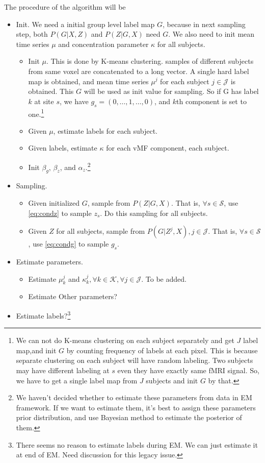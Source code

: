 \documentclass{article}
\begin{document}
The procedure of the algorithm will be 
\begin{itemize}
  \item Init. We need a initial group level label map $G$, because in next sampling step, both $P(G|X, Z)$ and $P(Z|G, X)$ need $G$. We also need to init mean time series $\mu$ and concentration parameter $\kappa$ for all subjects.
    \begin{itemize}
      \item Init $\mu$. This is done by K-means clustering. samples of different subjects from same voxel are concatenated to a long vector. A single hard label map is obtained, and mean time series $\mu^j$ for each subject $j\in \mathcal{J}$ is obtained. This $G$ will be used as init value for sampling. So if G has label $k$ at site $s$, we have $g_s = (0, \dots, 1, \dots, 0)$, and $k$th component is set to one.\footnote{We can not do K-means clustering on each subject separately and get $J$ label map,and init $G$ by counting frequency of labels at each pixel. This is because separate clustering on each subject will have random labeling. Two subjects may have different labeling at $s$ even they have exactly same fMRI signal. So, we have to get a single label map from $J$ subjects and init $G$ by that.} 
      \item Given $\mu$, estimate labels for each subject. 
      \item Given labels, estimate $\kappa$ for each vMF component, each subject.
      \item Init $\beta_g$, $\beta_z$, and $\alpha_z$.\footnote{We haven't decided whether to estimate these parameters from data in EM framework. If we want to estimate them, it's best to assign these parameters prior distribution, and use Bayesian method to estimate the posterior of them.}
    \end{itemize}
  \item Sampling.
    \begin{itemize}
    \item Given initialized $G$, sample from $P(Z|G, X)$. That is, $\forall s\in \mathcal{S}$, use \eqref{eq:condz} to sample $z_s$. Do this sampling for all subjects.
    \item Given  $Z$ for all subjects, sample from $P(G|Z^j, X), j\in \mathcal{J}$. That is, $\forall s\in \mathcal{S}$, use \eqref{eq:condg} to sample $g_s$.
      \end{itemize}
  \item Estimate parameters.
    \begin{itemize}
      \item Estimate $\mu_k^j$ and $\kappa_k^j, \forall k\in \mathcal{K}, \forall j \in \mathcal{J}$. To be added.
      \item Estimate Other parameters?
    \end{itemize}

    \item Estimate labels?\footnote{There seems no reason to estimate labels during EM. We can just estimate it at end of EM. Need discussion for this legacy issue.}
\end{itemize}
\end{document}
